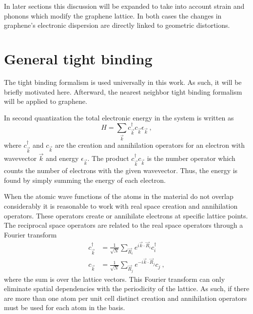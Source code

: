 In later sections this discussion will be expanded to take into account strain and phonons which modify the graphene lattice.
In both cases the changes in graphene's electronic dispersion are directly linked to geometric distortions.

\section{General tight binding}
The tight binding formalism is used universally in this work.
As such, it will be briefly motivated here.
Afterward, the nearest neighbor tight binding formalism will be applied to graphene.

In second quantization the total electronic energy in the system is written as
\begin{equation*}
	H=\sum_{\vec{k}} c^{\dagger}_{\vec{k}} c_{\vec{k}} \epsilon_{\vec{k}} \ ,
\end{equation*}
where $c^{\dagger}_{\vec{k}}$ and $c_{\vec{k}}$ are the creation and annihilation operators for an electron with wavevector $\vec{k}$ and energy $\epsilon_{\vec{k}}$.
The product $c^{\dagger}_{\vec{k}} c_{\vec{k}}$ is the number operator which counts the number of electrons with the given wavevector.
Thus, the energy is found by simply summing the energy of each electron.

When the atomic wave functions of the atoms in the material do not overlap considerably it is reasonable to work with real space creation and annihilation operators.
These operators create or annihilate electrons at specific lattice points.
The reciprocal space operators are related to the real space operators through a Fourier transform
\begin{align*}
	c^{\dagger}_{\vec{k}}&=\frac{1}{\sqrt{N}}\sum_{\vec{R}_i} e^{ i \vec{k} \cdot \vec{R}_i} c^{\dagger}_{i} \\
	c          _{\vec{k}}&=\frac{1}{\sqrt{N}}\sum_{\vec{R}_j} e^{-i \vec{k} \cdot \vec{R}_j} c_{j} \ ,
\end{align*}
where the sum is over the lattice vectors.
This Fourier transform can only eliminate spatial dependencies with the periodicity of the lattice.
As such, if there are more than one atom per unit cell distinct creation and annihilation operators must be used for each atom in the basis.

